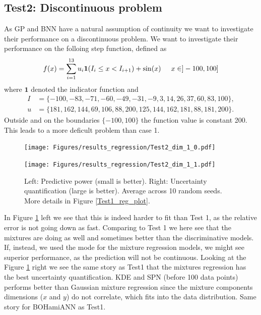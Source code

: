 \subsection*{Test2: Discontinuous problem}
As GP and BNN have a natural assumption of continuity we want to investigate their performance
on a discontinuous problem. We want to investigate their performance on the folloing step function, 
defined as 
$$f(x) = \sum_{i=1}^{13} u_i \bm{1}(I_{i}\leq x< I_{i+1}) + \sin(x) \hspace{0.5cm} x \in ]-100,100]$$
where $\bm{1}$ denoted the indicator function and
\begin{align*}
  I &= \{-100,  -83,  -71,  -60,  -49,  -31,   -9,    3,   14,26,   37,   60,   83,  100\},\\
  u &= \{181, 162, 144,  69, 106,  88, 200, 125, 144, 162, 181,88, 181, 200\}.
\end{align*}
Outside and on the boundaries $\{-100,100\}$ the function value is constant 200. This leads
to a more deficult problem than case 1. 
\begin{figure}[bth]
  \centering
  \begin{minipage}[b]{0.49\textwidth}
   \texttt{[image: Figures/results\_regression/Test2\_dim\_1\_0.pdf]}
  \end{minipage}
  \hfill
  \begin{minipage}[b]{0.49\textwidth}
    \texttt{[image: Figures/results\_regression/Test2\_dim\_1\_1.pdf]}
   \end{minipage}
  \caption{Left: Predictive power (small is better). Right: Uncertainty quantification (large is
  better). Average across 10 random seeds. More details in Figure \ref{Test1_reg_plot}.}
  \label{Test2_reg_plot}
\end{figure}


In Figure \ref{Test2_reg_plot} left we see that this is indeed harder to fit than Test 1, as the
relative error is not going down as fast. Comparing to Test 1 we here see that the mixtures are
doing as well and sometimes better than the discriminative models. If, instead, we used the mode for
the mixture regression models, we might see superior performance, as the prediction will not be
continuous. Looking at the Figure \ref{Test2_reg_plot} right we see the same story as Test1 that the
mixtures regression has the best uncertainty quantification. KDE and SPN (before 100 data points)
performs better than Gaussian mixture regression since the mixture components dimensions ($x$ and
$y$) do not correlate, which fits into the data distribution. Same story for BOHamiANN as Test1. 

